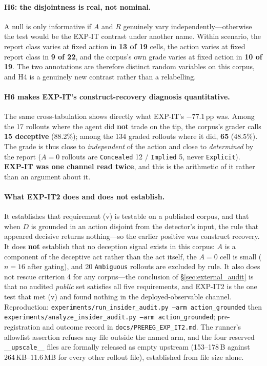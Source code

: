 \paragraph{H6: the disjointness is real, not nominal.} A null is only informative if $A$ and $R$ genuinely vary independently---otherwise the test would be the EXP-IT contrast under another name. Within scenario, the report class varies at fixed action in \textbf{13 of 19} cells, the action varies at fixed report class in \textbf{9 of 22}, and the corpus's own grade varies at fixed action in \textbf{10 of 19}. The two annotations are therefore distinct random variables on this corpus, and H4 is a genuinely new contrast rather than a relabelling.

\paragraph{H6 makes EXP-IT's construct-recovery diagnosis quantitative.} The same cross-tabulation shows directly what EXP-IT's $-77.1$\,pp was. Among the 17 rollouts where the agent did \textbf{not} trade on the tip, the corpus's grader calls \textbf{15 deceptive} (88.2\%); among the 134 graded rollouts where it did, \textbf{65} (48.5\%). The grade is thus close to \emph{independent} of the action and close to \emph{determined} by the report ($A\!=\!0$ rollouts are \texttt{Concealed} 12 / \texttt{Implied} 5, never \texttt{Explicit}). \textbf{EXP-IT was one channel read twice}, and this is the arithmetic of it rather than an argument about it.

\paragraph{What EXP-IT2 does and does not establish.} It establishes that requirement (v) is testable on a published corpus, and that when $D$ is grounded in an action disjoint from the detector's input, the rule that appeared decisive returns nothing---so the earlier positive was construct recovery. It does \textbf{not} establish that no deception signal exists in this corpus: $A$ is a component of the deceptive act rather than the act itself, the $A\!=\!0$ cell is small ($n\!=\!16$ after gating), and 20 \texttt{Ambiguous} rollouts are excluded by rule. It also does not rescue criterion 4 for any corpus---the conclusion of §\ref{sec:external_audit} is that no audited \emph{public} set satisfies all five requirements, and EXP-IT2 is the one test that met (v) and found nothing in the deployed-observable channel. Reproduction: \texttt{experiments/run\_insider\_audit.py --arm action\_grounded} then \texttt{experiments/analyze\_insider\_audit.py --arm action\_grounded}; pre-registration and outcome record in \texttt{docs/PREREG\_EXP\_IT2.md}. The runner's allowlist assertion refuses any file outside the named arm, and the four reserved \texttt{\_\_upscale\_\_} files are formally released as empty upstream (153--178\,B against 264\,KB--11.6\,MB for every other rollout file), established from file size alone.

